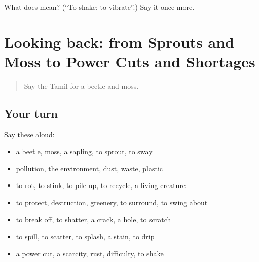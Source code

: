 \begin{tcolorbox}[breakable,colback=teal!4,colframe=teal!35!black,title={Before you move on}]
What does  mean? (\textquotedblleft{}To shake; to vibrate\textquotedblright{}.) Say it once more.
\end{tcolorbox}
\section[(dialogue)]{Looking back: from Sprouts and Moss to Power Cuts and Shortages}

\label{lesson:TA-R445-review-439-445}



\begin{quote}
Say the Tamil for a beetle and moss.
\end{quote}

\subsection*{Your turn}
Say these aloud:

\begin{itemize}
\raggedright
  \item a beetle, moss, a sapling, to sprout, to sway
  \item pollution, the environment, dust, waste, plastic
  \item to rot, to stink, to pile up, to recycle, a living creature
  \item to protect, destruction, greenery, to surround, to swing about
  \item to break off, to shatter, a crack, a hole, to scratch
  \item to spill, to scatter, to splash, a stain, to drip
  \item a power cut, a scarcity, rust, difficulty, to shake
\end{itemize}

